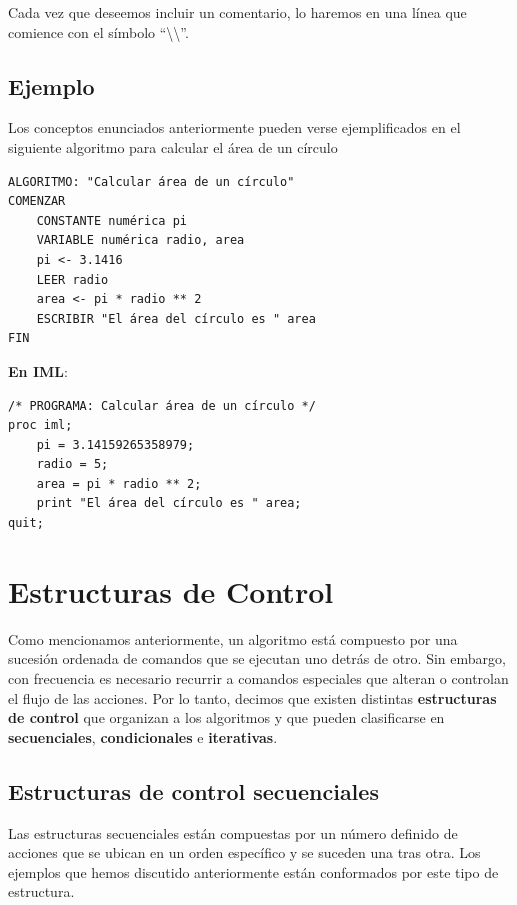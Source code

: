 \documentclass[]{book}
\begin{document}
Cada vez que deseemos incluir un comentario, lo haremos en una línea que
comience con el símbolo ``\textbackslash{}\textbackslash{}''.

\section{Ejemplo}\label{ejemplo}

Los conceptos enunciados anteriormente pueden verse ejemplificados en el
siguiente algoritmo para calcular el área de un círculo

\begin{verbatim}
ALGORITMO: "Calcular área de un círculo"
COMENZAR
    CONSTANTE numérica pi
    VARIABLE numérica radio, area
    pi <- 3.1416
    LEER radio
    area <- pi * radio ** 2
    ESCRIBIR "El área del círculo es " area
FIN
\end{verbatim}

\textbf{En IML}:

\begin{verbatim}
/* PROGRAMA: Calcular área de un círculo */
proc iml;
    pi = 3.14159265358979;
    radio = 5;
    area = pi * radio ** 2;
    print "El área del círculo es " area;
quit;
\end{verbatim}

\chapter{Estructuras de Control}\label{estructuras-de-control}

Como mencionamos anteriormente, un algoritmo está compuesto por una
sucesión ordenada de comandos que se ejecutan uno detrás de otro. Sin
embargo, con frecuencia es necesario recurrir a comandos especiales que
alteran o controlan el flujo de las acciones. Por lo tanto, decimos que
existen distintas \textbf{estructuras de control} que organizan a los
algoritmos y que pueden clasificarse en \textbf{secuenciales},
\textbf{condicionales} e \textbf{iterativas}.

\section{Estructuras de control
secuenciales}\label{estructuras-de-control-secuenciales}

Las estructuras secuenciales están compuestas por un número definido de
acciones que se ubican en un orden específico y se suceden una tras
otra. Los ejemplos que hemos discutido anteriormente están conformados
por este tipo de estructura.
\end{document}
